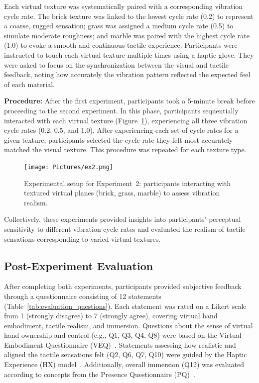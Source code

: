 Each virtual texture was systematically paired with a corresponding vibration cycle rate. The brick texture was linked to the lowest cycle rate (0.2) to represent a coarse, rugged sensation; grass was assigned a medium cycle rate (0.5) to simulate moderate roughness; and marble was paired with the highest cycle rate (1.0) to evoke a smooth and continuous tactile experience. Participants were instructed to touch each virtual texture multiple times using a haptic glove. They were asked to focus on the synchronization between the visual and tactile feedback, noting how accurately the vibration pattern reflected the expected feel of each material.

\textbf{Procedure:} After the first experiment, participants took a 5-minute break before proceeding to the second experiment. In this phase, participants sequentially interacted with each virtual texture (Figure~\ref{fig:experiment2_setup}), experiencing all three vibration cycle rates (0.2, 0.5, and 1.0). After experiencing each set of cycle rates for a given texture, participants selected the cycle rate they felt most accurately matched the visual texture. This procedure was repeated for each texture type.

\begin{figure}[H]\centering
	\texttt{[image: Pictures/ex2.png]}%
	\caption{Experimental setup for Experiment~2: participants interacting with textured virtual planes (brick, grass, marble) to assess vibration realism.}\label{fig:experiment2_setup}
\end{figure}

Collectively, these experiments provided insights into participants' perceptual sensitivity to different vibration cycle rates and evaluated the realism of tactile sensations corresponding to varied virtual textures.

\newpage
\subsection{Post-Experiment Evaluation}
After completing both experiments, participants provided subjective feedback through a questionnaire consisting of 12 statements (Table~\ref{tab:evaluation_questions}). Each statement was rated on a Likert scale from 1 (strongly disagree) to 7 (strongly agree), covering virtual hand embodiment, tactile realism, and immersion. Questions about the sense of virtual hand ownership and control (e.g., Q1, Q3, Q4, Q8) were based on the Virtual Embodiment Questionnaire (VEQ)~\cite{10.1145/3027063.3053272}. Statements assessing how realistic and aligned the tactile sensations felt (Q2, Q6, Q7, Q10) were guided by the Haptic Experience (HX) model~\cite{10.1016/j.ijhcs.2017.04.004}. Additionally, overall immersion (Q12) was evaluated according to concepts from the Presence Questionnaire (PQ)~\cite{10.1162/105474698565686}.

